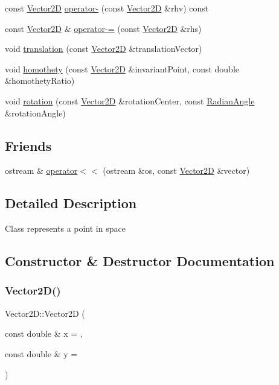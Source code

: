 \begin{DoxyCompactItemize}
\item 
const \hyperlink{class_vector2_d}{Vector2D} \hyperlink{class_vector2_d_a107f6955e56db7e2f0f8e86e6a4a4be2}{operator-\/} (const \hyperlink{class_vector2_d}{Vector2D} \&rhv) const
\item 
const \hyperlink{class_vector2_d}{Vector2D} \& \hyperlink{class_vector2_d_a39e1e309b40f2b3df02d26911e4637cc}{operator-\/=} (const \hyperlink{class_vector2_d}{Vector2D} \&rhs)
\item 
void \hyperlink{class_vector2_d_a86c7035a75207b3666a688eb9f4f6170}{translation} (const \hyperlink{class_vector2_d}{Vector2D} \&translation\+Vector)
\item 
void \hyperlink{class_vector2_d_ac8556496b88bf5a0928615822457b7b3}{homothety} (const \hyperlink{class_vector2_d}{Vector2D} \&invariant\+Point, const double \&homothety\+Ratio)
\item 
void \hyperlink{class_vector2_d_ad6604a58165c7144f87b8f555d248dde}{rotation} (const \hyperlink{class_vector2_d}{Vector2D} \&rotation\+Center, const \hyperlink{class_radian_angle}{Radian\+Angle} \&rotation\+Angle)
\end{DoxyCompactItemize}
\subsection*{Friends}
\begin{DoxyCompactItemize}
\item 
ostream \& \hyperlink{class_vector2_d_a947884ffef441f605f61b9bb1a2dab13}{operator$<$$<$} (ostream \&os, const \hyperlink{class_vector2_d}{Vector2D} \&vector)
\end{DoxyCompactItemize}


\subsection{Detailed Description}
Class represents a point in space 

\subsection{Constructor \& Destructor Documentation}
\hypertarget{class_vector2_d_affaf87a7d9ce6c6566c8fe0fe000dfae}{}\label{class_vector2_d_affaf87a7d9ce6c6566c8fe0fe000dfae} 
\subsubsection{\texorpdfstring{Vector2\+D()}{Vector2D()}}
{\footnotesize\ttfamily Vector2\+D\+::\+Vector2D (\begin{DoxyParamCaption}\item[{const double \&}]{x = {},  }\item[{const double \&}]{y = {} }\end{DoxyParamCaption})}

